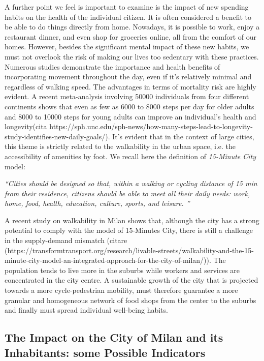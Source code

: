 A further point we feel is important to examine is the impact of new spending habits on the health of the individual citizen. 
It is often considered a benefit to be able to do things directly from home. Nowadays, it is possible to work, enjoy a restaurant dinner, and even shop for groceries online, all from the comfort of our homes. However, besides the significant mental impact of these new habits, we must not overlook the risk of making our lives too sedentary with these practices.
Numerous studies demonstrate the importance and health benefits of incorporating movement throughout the day, even if it's relatively minimal and regardless of walking speed. The advantages in terms of mortality risk are highly evident. A recent meta-analysis involving 50000 individuals from four different continents shows that even as few as 6000 to 8000 steps per day for older adults and 8000 to 10000 steps for young adults can improve an individual's health and longevity(cita https://sph.unc.edu/sph-news/how-many-steps-lead-to-longevity-study-identifies-new-daily-goals/). It's evident that in the context of large cities, this theme is strictly related to the walkability in the urban space, i.e. the accessibility of amenities by foot. We recall here the definition of \textit{15-Minute City} model:

\begin{center}
\textit{``Cities should be designed so that, within a walking or cycling distance of 15 min from their residence, citizens should be able to meet all their daily needs: work, home, food, health, education, culture, sports, and leisure. 
''}
\end{center}

A recent study on walkability in Milan shows that, although the city has a strong potential to comply with the model of 15-Minutes City, there is still a challenge in the supply-demand mismatch (citare (https://transformtransport.org/research/livable-streets/walkability-and-the-15-minute-city-model-an-integrated-approach-for-the-city-of-milan/)). The population tends to live more in the suburbs while workers and services are concentrated in the city centre.
A sustainable growth of the city that is projected towards a more cycle-pedestrian mobility, must therefore guarantee a more granular and homogeneous network of food shops from the center to the suburbs and finally must spread individual well-being habits.

\subsection{The Impact on the City of Milan and its Inhabitants: some Possible Indicators}

